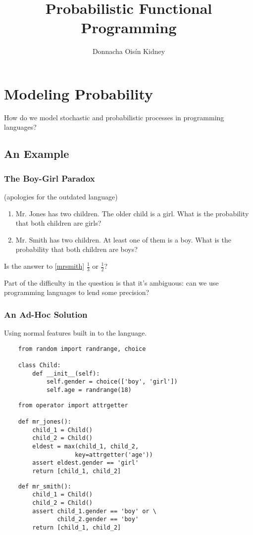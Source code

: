 \documentclass[usenames,dvipsnames]{beamer}
\title{Probabilistic Functional Programming}
\author{Donnacha Oisín Kidney}
\begin{document}
\frame{\titlepage}
\begin{frame}
  \begin{multicols}{2}
    \tableofcontents
  \end{multicols}
\end{frame}
\section{Modeling Probability}
\begin{frame}
  How do we model stochastic and probabilistic processes in programming
  languages?
\end{frame}
\subsection{An Example}
\begin{frame}
  \frametitle{The Boy-Girl Paradox}
  (apologies for the outdated language)
  \begin{enumerate}
    \item Mr. Jones has two children. The older child is a girl. What is the
      probability that both children are girls?
    \item \label{mrsmith} Mr. Smith has two children. At least one of them is a
      boy. What is the probability that both children are boys?
  \end{enumerate}
  \pause
  Is the answer to \ref{mrsmith} $\frac{1}{3}$ or $\frac{1}{2}$?
  \pause

  Part of the difficulty in the question is that it's ambiguous: can we use
  programming languages to lend some precision?
\end{frame}
\begin{frame}
  \frametitle{An Ad-Hoc Solution}
  Using normal features built in to the language.
  \begin{verbatim}
    from random import randrange, choice

    class Child:
        def __init__(self):
            self.gender = choice(['boy', 'girl'])
            self.age = randrange(18)
  \end{verbatim}
  \begin{verbatim}
    from operator import attrgetter

    def mr_jones():
        child_1 = Child()
        child_2 = Child()
        eldest = max(child_1, child_2,
                    key=attrgetter('age'))
        assert eldest.gender == 'girl'
        return [child_1, child_2]
  \end{verbatim}
  \begin{verbatim}
    def mr_smith():
        child_1 = Child()
        child_2 = Child()
        assert child_1.gender == 'boy' or \
               child_2.gender == 'boy'
        return [child_1, child_2]
  \end{verbatim}
\end{frame}
\end{document}
